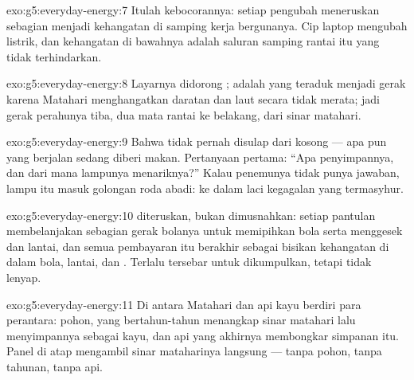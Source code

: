 \begin{solution}{exo:g5:everyday-energy:7}
Itulah kebocorannya: setiap pengubah meneruskan sebagian 
menjadi kehangatan di samping kerja bergunanya. Cip laptop mengubah
 listrik, dan kehangatan di bawahnya adalah saluran samping
rantai itu yang tidak terhindarkan.
\end{solution}

\begin{solution}{exo:g5:everyday-energy:8}
Layarnya didorong ;  adalah  yang teraduk menjadi gerak
karena Matahari menghangatkan daratan dan laut secara tidak merata;
jadi  gerak perahunya tiba, dua mata rantai ke belakang, dari
sinar matahari.
\end{solution}

\begin{solution}{exo:g5:everyday-energy:9}
Bahwa  tidak pernah disulap dari  kosong --- apa pun yang
berjalan sedang diberi makan. Pertanyaan pertama: ``Apa penyimpannya,
dan dari mana lampunya menariknya?'' Kalau penemunya tidak punya
jawaban, lampu itu masuk golongan roda abadi: ke dalam laci kegagalan
yang termasyhur.
\end{solution}

\begin{solution}{exo:g5:everyday-energy:10}
 diteruskan, bukan dimusnahkan: setiap pantulan membelanjakan
sebagian  gerak bolanya untuk memipihkan bola serta menggesek
 dan lantai, dan semua pembayaran itu berakhir sebagai bisikan
kehangatan di dalam bola, lantai, dan . Terlalu tersebar untuk
dikumpulkan, tetapi tidak lenyap.
\end{solution}

\begin{solution}{exo:g5:everyday-energy:11}
Di antara Matahari dan api kayu berdiri para perantara: pohon, yang
bertahun-tahun menangkap sinar matahari lalu menyimpannya sebagai
kayu, dan api yang akhirnya membongkar simpanan itu. Panel di atap
mengambil  sinar mataharinya langsung --- tanpa pohon, tanpa
tahunan, tanpa api.
\end{solution}
